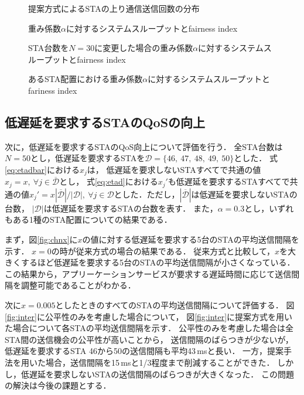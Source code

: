 \documentclass[twocolumn, a4paper]{ieicejsp}
\begin{document}
		\begin{figure}[t]
			\centering
			\caption{提案方式によるSTAの上り通信送信回数の分布}
			\label{fig:fair}
		\end{figure}

		\begin{figure}[t]
			\centering
			\caption{重み係数$\alpha$に対するシステムスループットとfairness index}
			\label{fig:thr_fair}
		\end{figure}

		\begin{figure}[t]
			\centering
			\caption{STA台数を$N=30$に変更した場合の重み係数$\alpha$に対するシステムスループットとfairness index}
			\label{fig:chgnum}

			\caption{あるSTA配置における重み係数$\alpha$に対するシステムスループットとfariness index}
			\label{fig:chgtopology}
		\end{figure}

	\subsection{低遅延を要求するSTAのQoSの向上}
		次に，低遅延を要求するSTAのQoS向上について評価を行う．
		全STA台数は$N=50$とし，低遅延を要求するSTAを${\mathcal D}=\{46,\ 47,\ 48,\ 49,\ 50\}$とした．
		式\eqref{eq:etadbar}における$x_j$は，
		低遅延を要求しないSTAすべてで共通の値$x_j=x,\ \forall j\in {\overline {\mathcal D}}$とし，
		式\eqref{eq:etad}における$x_j'$も低遅延を要求するSTAすべてで共通の値$x_j'=x|{\overline {\mathcal D}}|/|{\mathcal D}|,\ \forall j \in {\mathcal D}$とした．ただし，$|{\overline {\mathcal D}}|$は低遅延を要求しないSTAの台数，
		$|{\mathcal D}|$は低遅延を要求するSTAの台数を表す．
		また，$\alpha=0.3$とし，いずれもある1種のSTA配置についての結果である．
		\par
		まず，図\ref{fig:chnx}に$x$の値に対する低遅延を要求する5台のSTAの平均送信間隔を示す．
		$x=0$の時が従来方式の場合の結果である．
		従来方式と比較して，$x$を大きくするほど低遅延を要求する5台のSTAの平均送信間隔が小さくなっている．
		この結果から，アプリーケーションサービスが要求する遅延時間に応じて送信間隔を調整可能であることがわかる．
		\par
		次に$x=0.005$としたときのすべてのSTAの平均送信間隔について評価する．
		図\ref{fig:inter}に公平性のみを考慮した場合について，
		図\ref{fig:inter}に提案方式を用いた場合について各STAの平均送信間隔を示す．
		公平性のみを考慮した場合は全STA間の送信機会の公平性が高いことから，
		送信間隔のばらつきが少ないが，低遅延を要求するSTA 46から50の送信間隔も平均43\,msと長い．
		一方，提案手法を用いた場合，送信間隔を15\,msと1/3程度まで削減することができた．
		しかし，低遅延を要求しないSTAの送信間隔のばらつきが大きくなった．
		この問題の解決は今後の課題とする．
\end{document}
